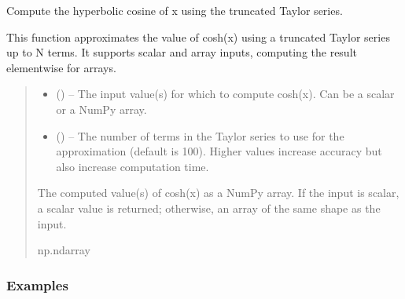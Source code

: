 \documentclass[a4paper,10pt,oneside,english]{sphinxmanual}
\begin{document}

\begin{fulllineitems}
\label{\detokenize{acsefunctions:acsefunctions.functions.cosh}}
\pysigstartsignatures
\pysiglinewithargsret
{}
{\sphinxparamcomma {}}
{}
\pysigstopsignatures
\sphinxAtStartPar
Compute the hyperbolic cosine of x using the truncated Taylor series.

\sphinxAtStartPar
This function approximates the value of cosh(x) using a
truncated Taylor series
up to N terms. It supports scalar and array inputs, computing the result
element\sphinxhyphen{}wise for arrays.
\begin{quote}\begin{description}
\begin{itemize}
\item {} 
\sphinxAtStartPar
{} () – The input value(s) for which to compute cosh(x). Can be a scalar or a
NumPy array.

\item {} 
\sphinxAtStartPar
{} (\sphinxstyleliteralemphasis{\sphinxupquote{, }}) – The number of terms in the Taylor series to use for the approximation
(default is 100). Higher values increase accuracy but also
increase computation time.

\end{itemize}

\sphinxAtStartPar
The computed value(s) of cosh(x) as a NumPy array.
If the input is scalar,
a scalar value is returned; otherwise, an array of the same shape as
the input.

\sphinxAtStartPar
np.ndarray

\end{description}\end{quote}
\subsubsection*{Examples}


\end{fulllineitems}
\end{document}
